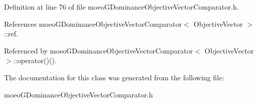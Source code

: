 Definition at line 76 of file moeo\-GDominance\-Objective\-Vector\-Comparator.h.

References moeo\-GDominance\-Objective\-Vector\-Comparator$<$ Objective\-Vector $>$::ref.

Referenced by moeo\-GDominance\-Objective\-Vector\-Comparator$<$ Objective\-Vector $>$::operator()().

The documentation for this class was generated from the following file:\begin{CompactItemize}
\item 
moeo\-GDominance\-Objective\-Vector\-Comparator.h\end{CompactItemize}
